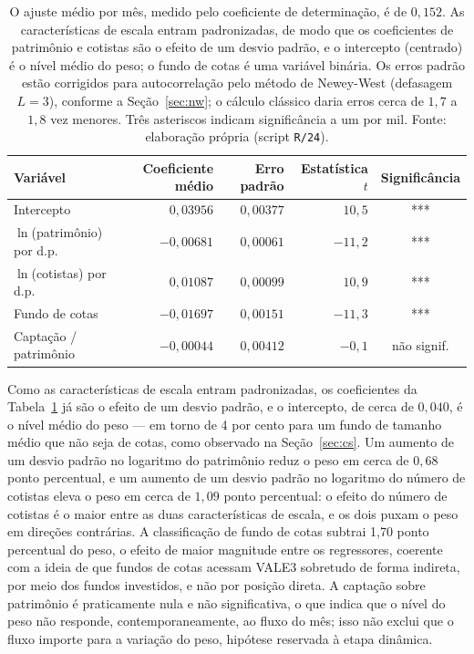 \documentclass[12pt,a4paper]{article}
\begin{document}
\begin{table}[h]\centering\small
\caption{Regressão do peso mês a mês, resumo no estilo Fama--MacBeth (72 meses).}
\label{tab:fmtab}
\begin{tabular}{@{}lrrrc@{}}
\toprule
Variável & Coeficiente médio & Erro padrão & Estatística $t$ & Significância \\
\midrule
Intercepto                    & $0{,}03956$ & $0{,}00377$ & $10{,}5$  & *** \\
$\ln$(patrimônio) por d.p.    & $-0{,}00681$ & $0{,}00061$ & $-11{,}2$ & *** \\
$\ln$(cotistas) por d.p.      & $0{,}01087$  & $0{,}00099$ & $10{,}9$  & *** \\
Fundo de cotas                & $-0{,}01697$ & $0{,}00151$ & $-11{,}3$ & *** \\
Captação / patrimônio         & $-0{,}00044$ & $0{,}00412$ & $-0{,}1$  & não signif. \\
\bottomrule
\end{tabular}
\caption*{\footnotesize O ajuste médio por mês, medido pelo coeficiente de determinação, é de
$0{,}152$. As características de escala entram padronizadas, de modo que os coeficientes de
patrimônio e cotistas são o efeito de um desvio padrão, e o intercepto (centrado) é o nível médio
do peso; o fundo de cotas é uma variável binária. Os erros padrão estão corrigidos para
autocorrelação pelo método de Newey-West (defasagem $L=3$), conforme a Seção~\ref{sec:nw}; o cálculo
clássico daria erros cerca de $1{,}7$ a $1{,}8$ vez menores. Três asteriscos indicam significância a
um por mil. Fonte: elaboração própria (script \texttt{R/24}).}
\end{table}

Como as características de escala entram padronizadas, os coeficientes da Tabela~\ref{tab:fmtab} já
são o efeito de um desvio padrão, e o intercepto, de cerca de $0{,}040$, é o nível médio do peso ---
em torno de 4 por cento para um fundo de tamanho médio que não seja de cotas, como observado na
Seção~\ref{sec:cs}. Um aumento de um desvio
padrão no logaritmo do patrimônio reduz o peso em cerca de $0{,}68$ ponto percentual, e um aumento
de um desvio padrão no logaritmo do número de cotistas eleva o peso em cerca de $1{,}09$ ponto
percentual: o efeito do número de cotistas é o maior entre as duas características de escala, e os
dois puxam o peso em direções contrárias. A
classificação de fundo de cotas subtrai 1,70 ponto percentual do peso, o efeito de maior
magnitude entre os regressores, coerente com a ideia de que fundos de cotas acessam VALE3
sobretudo de forma indireta, por meio dos fundos investidos, e não por posição direta. A captação
sobre patrimônio é praticamente nula e não significativa, o que indica que o nível do peso não
responde, contemporaneamente, ao fluxo do mês; isso não exclui que o fluxo importe para a
variação do peso, hipótese reservada à etapa dinâmica.
\end{document}

